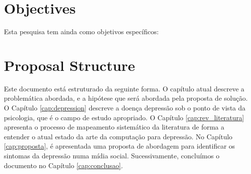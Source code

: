 




\section{Objectives}
\label{sec:objectives}

Esta pesquisa tem ainda como objetivos específicos:

\section{Proposal Structure}
\label{sec:organization}
Este documento está estruturado da seguinte forma. O capítulo atual descreve a problemática abordada, e a hipótese que será abordada pela proposta de solução.
O Capítulo \ref{cap:depression} descreve a doença depressão sob o ponto de vista da psicologia, que é o campo de estudo apropriado.
O Capítulo \ref{cap:rev_literatura} apresenta o processo de mapeamento sistemático da literatura de forma a entender o atual estado da arte da computação para depressão.
No Capítulo \ref{cap:proposta}, é apresentada uma proposta de abordagem para identificar os sintomas da depressão numa mídia social. Sucessivamente, concluímos o documento no Capítulo \ref{cap:conclusao}.